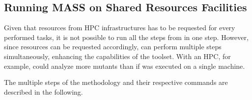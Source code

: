 \subsection{Running MASS on Shared Resources Facilities}
\label{sec:shared}

Given that resources from HPC infrastructures has to be requested for every performed tasks, it is not possible to run all the steps from \MASS in one step.
However, since resources can be requested accordingly, \MASS can perform multiple steps simultaneously, enhancing the capabilities of the toolset. With an HPC, for example, \MASS could analyze more mutants than if \MASS was executed on a single machine.

The multiple steps of the methodology and their respective commands are described in the following.

